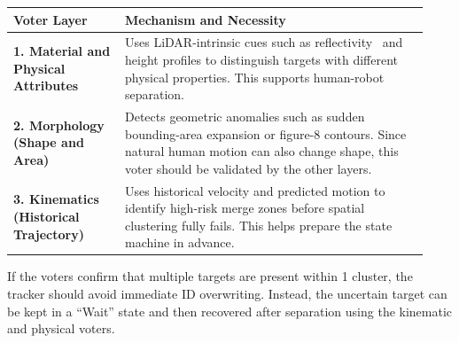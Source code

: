 \documentclass[11pt,a4paper]{report}
\begin{document}
\begin{contentbox}
\begin{center}
    \renewcommand{\arraystretch}{1.2}
    \small
    \begin{tabular}{|p{0.25\linewidth}|p{0.68\linewidth}|}
        \hline
        \textbf{Voter Layer} & \textbf{Mechanism and Necessity} \\
        \hline
        \textbf{1. Material and Physical Attributes} &
        Uses LiDAR-intrinsic cues such as reflectivity~\cite{dong2023rliom} and height profiles to distinguish targets with different physical properties. This supports human-robot separation. \\
        \hline
        \textbf{2. Morphology \newline (Shape and Area)} &
        Detects geometric anomalies such as sudden bounding-area expansion or figure-8 contours. Since natural human motion can also change shape, this voter should be validated by the other layers. \\
        \hline
        \textbf{3. Kinematics \newline (Historical Trajectory)} &
        Uses historical velocity and predicted motion to identify high-risk merge zones before spatial clustering fully fails. This helps prepare the state machine in advance. \\
        \hline
    \end{tabular}
    \label{tab:3_voter}
\end{center}

\vspace*{0.8em}
If the voters confirm that multiple targets are present within 1 cluster, the tracker should avoid immediate ID overwriting. Instead, the uncertain target can be kept in a ``Wait'' state and then recovered after separation using the kinematic and physical voters.
\end{contentbox}

\end{document}
